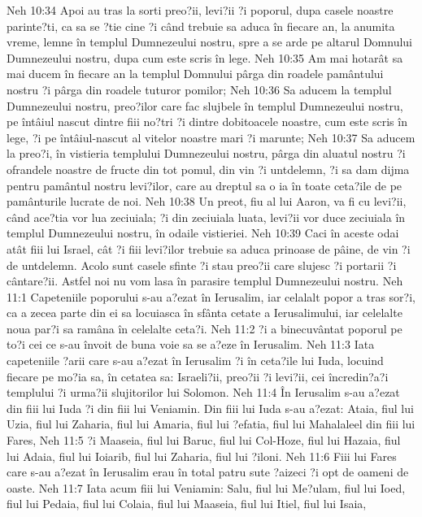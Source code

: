 Neh 10:34  Apoi au tras la sorti preo?ii, levi?ii ?i poporul, dupa casele noastre parinte?ti, ca sa se ?tie cine ?i când trebuie sa aduca în fiecare an, la anumita vreme, lemne în templul Dumnezeului nostru, spre a se arde pe altarul Domnului Dumnezeului nostru, dupa cum este scris în lege.
Neh 10:35  Am mai hotarât sa mai ducem în fiecare an la templul Domnului pârga din roadele pamântului nostru ?i pârga din roadele tuturor pomilor;
Neh 10:36  Sa aducem la templul Dumnezeului nostru, preo?ilor care fac slujbele în templul Dumnezeului nostru, pe întâiul nascut dintre fiii no?tri ?i dintre dobitoacele noastre, cum este scris în lege, ?i pe întâiul-nascut al vitelor noastre mari ?i marunte;
Neh 10:37  Sa aducem la preo?i, în vistieria templului Dumnezeului nostru, pârga din aluatul nostru ?i ofrandele noastre de fructe din tot pomul, din vin ?i untdelemn, ?i sa dam dijma pentru pamântul nostru levi?ilor, care au dreptul sa o ia în toate ceta?ile de pe pamânturile lucrate de noi.
Neh 10:38  Un preot, fiu al lui Aaron, va fi cu levi?ii, când ace?tia vor lua zeciuiala; ?i din zeciuiala luata, levi?ii vor duce zeciuiala în templul Dumnezeului nostru, în odaile vistieriei.
Neh 10:39  Caci în aceste odai atât fiii lui Israel, cât ?i fiii levi?ilor trebuie sa aduca prinoase de pâine, de vin ?i de untdelemn. Acolo sunt casele sfinte ?i stau preo?ii care slujesc ?i portarii ?i cântare?ii. Astfel noi nu vom lasa în parasire templul Dumnezeului nostru.
Neh 11:1  Capeteniile poporului s-au a?ezat în Ierusalim, iar celalalt popor a tras sor?i, ca a zecea parte din ei sa locuiasca în sfânta cetate a Ierusalimului, iar celelalte noua par?i sa ramâna în celelalte ceta?i.
Neh 11:2  ?i a binecuvântat poporul pe to?i cei ce s-au învoit de buna voie sa se a?eze în Ierusalim.
Neh 11:3  Iata capeteniile ?arii care s-au a?ezat în Ierusalim ?i în ceta?ile lui Iuda, locuind fiecare pe mo?ia sa, în cetatea sa: Israeli?ii, preo?ii ?i levi?ii, cei încredin?a?i templului ?i urma?ii slujitorilor lui Solomon.
Neh 11:4  În Ierusalim s-au a?ezat din fiii lui Iuda ?i din fiii lui Veniamin. Din fiii lui Iuda s-au a?ezat: Ataia, fiul lui Uzia, fiul lui Zaharia, fiul lui Amaria, fiul lui ?efatia, fiul lui Mahalaleel din fiii lui Fares,
Neh 11:5  ?i Maaseia, fiul lui Baruc, fiul lui Col-Hoze, fiul lui Hazaia, fiul lui Adaia, fiul lui Ioiarib, fiul lui Zaharia, fiul lui ?iloni.
Neh 11:6  Fiii lui Fares care s-au a?ezat în Ierusalim erau în total patru sute ?aizeci ?i opt de oameni de oaste.
Neh 11:7  Iata acum fiii lui Veniamin: Salu, fiul lui Me?ulam, fiul lui Ioed, fiul lui Pedaia, fiul lui Colaia, fiul lui Maaseia, fiul lui Itiel, fiul lui Isaia,
